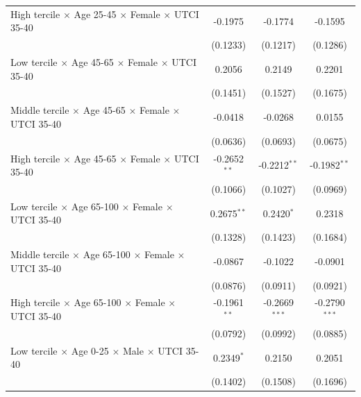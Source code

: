 \begin{table}[htbp]
\begin{tabular}{lccc}
      High tercile $\times$ Age 25-45 $\times$ Female $\times$ UTCI 35-40       & -0.1975        & -0.1774           & -0.1595\\   
                                                                                & (0.1233)       & (0.1217)          & (0.1286)\\   
      Low tercile $\times$ Age 45-65 $\times$ Female $\times$ UTCI 35-40        & 0.2056         & 0.2149            & 0.2201\\   
                                                                                & (0.1451)       & (0.1527)          & (0.1675)\\   
      Middle tercile $\times$ Age 45-65 $\times$ Female $\times$ UTCI 35-40     & -0.0418        & -0.0268           & 0.0155\\   
                                                                                & (0.0636)       & (0.0693)          & (0.0675)\\   
      High tercile $\times$ Age 45-65 $\times$ Female $\times$ UTCI 35-40       & -0.2652$^{**}$ & -0.2212$^{**}$    & -0.1982$^{**}$\\   
                                                                                & (0.1066)       & (0.1027)          & (0.0969)\\   
      Low tercile $\times$ Age 65-100 $\times$ Female $\times$ UTCI 35-40       & 0.2675$^{**}$  & 0.2420$^{*}$      & 0.2318\\   
                                                                                & (0.1328)       & (0.1423)          & (0.1684)\\   
      Middle tercile $\times$ Age 65-100 $\times$ Female $\times$ UTCI 35-40    & -0.0867        & -0.1022           & -0.0901\\   
                                                                                & (0.0876)       & (0.0911)          & (0.0921)\\   
      High tercile $\times$ Age 65-100 $\times$ Female $\times$ UTCI 35-40      & -0.1961$^{**}$ & -0.2669$^{***}$   & -0.2790$^{***}$\\   
                                                                                & (0.0792)       & (0.0992)          & (0.0885)\\   
      Low tercile $\times$ Age 0-25 $\times$ Male $\times$ UTCI 35-40           & 0.2349$^{*}$   & 0.2150            & 0.2051\\   
                                                                                & (0.1402)       & (0.1508)          & (0.1696)\\   

\end{tabular}
\end{table}
